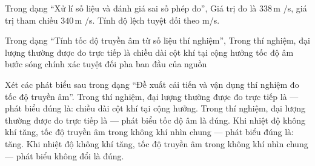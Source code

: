 \begin{ex}
Trong dạng “Xử lí số liệu và đánh giá sai số phép đo”, Giá trị đo là $338\,\text{m}$ /s, giá trị tham chiếu $340\,\text{m}$ /s. Tính độ lệch tuyệt đối theo m/s.
\end{ex}

\begin{ex}
Trong dạng “Tính tốc độ truyền âm từ số liệu thí nghiệm”, Trong thí nghiệm, đại lượng thường được đo trực tiếp là
\choice
{\True chiều dài cột khí tại cộng hưởng}
{tốc độ âm}
{bước sóng chính xác tuyệt đối}
{pha ban đầu của nguồn}
\end{ex}

\begin{ex}
Xét các phát biểu sau trong dạng “Đề xuất cải tiến và vận dụng thí nghiệm đo tốc độ truyền âm”.
\choiceTF
{\True Trong thí nghiệm, đại lượng thường được đo trực tiếp là — phát biểu đúng là: chiều dài cột khí tại cộng hưởng.}
{Trong thí nghiệm, đại lượng thường được đo trực tiếp là — phát biểu tốc độ âm là đúng.}
{\True Khi nhiệt độ không khí tăng, tốc độ truyền âm trong không khí nhìn chung — phát biểu đúng là: tăng.}
{Khi nhiệt độ không khí tăng, tốc độ truyền âm trong không khí nhìn chung — phát biểu không đổi là đúng.}
\end{ex}

